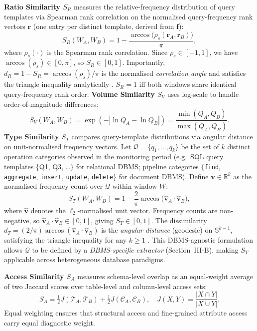 \documentclass[10pt,twocolumn,a4paper]{article}
\newcommand{\SR}{S_{R}}
\newcommand{\SV}{S_{V}}
\newcommand{\ST}{S_{T}}
\newcommand{\SA}{S_{A}}
\begin{document}
\textbf{Ratio Similarity $\SR$} measures the relative-frequency
distribution of query templates via Spearman rank correlation on the
normalised query-frequency rank vectors $\mathbf{r}$ (one entry per
distinct template, derived from $\mathbf{f}$):
\begin{equation}
  \SR(W_A,W_B) = 1 - \frac{\arccos\!\bigl(\rho_s(\mathbf{r}_A,\mathbf{r}_B)\bigr)}{\pi},
\end{equation}
where $\rho_s(\cdot)$ is the Spearman rank correlation.
Since $\rho_s\!\in\![-1,1]$, we have $\arccos(\rho_s)\!\in\![0,\pi]$,
so $\SR\!\in\![0,1]$. Importantly, $d_R\!=\!1\!-\!\SR\!=\!\arccos(\rho_s)/\pi$
is the normalised \emph{correlation angle} and satisfies the triangle
inequality analytically \cite{Deza2009Distances}.
$\SR\!=\!1$ iff both windows share identical query-frequency rank order.
\textbf{Volume Similarity $\SV$} uses log-scale to handle
order-of-magnitude differences:
\begin{equation}
  \SV(W_A,W_B) = \exp(-|\ln Q_A - \ln Q_B|) = \frac{\min(Q_A,Q_B)}{\max(Q_A,Q_B)}.
\end{equation}
\textbf{Type Similarity $\ST$} compares query-template distributions via
angular distance on unit-normalised frequency vectors.
Let $\mathcal{Q}\!=\!\{q_1,\ldots,q_k\}$ be the set of $k$ distinct
operation categories observed in the monitoring period
(e.g.\ SQL query templates $\{$Q1, Q3, \ldots$\}$ for relational DBMS;
pipeline categories $\{$\texttt{find}, \texttt{aggregate},
\texttt{insert}, \texttt{update}, \texttt{delete}$\}$ for document DBMS).
Define $\mathbf{v}\!\in\!\mathbb{R}^k$ as the normalised frequency count
over $\mathcal{Q}$ within window $W$:
\begin{equation}
  \ST(W_A,W_B) = 1 - \frac{2}{\pi}\arccos\!\bigl(\hat{\mathbf{v}}_A\cdot\hat{\mathbf{v}}_B\bigr),
\end{equation}
where $\hat{\mathbf{v}}$ denotes the $\ell_2$-normalised unit vector.
Frequency counts are non-negative, so
$\hat{\mathbf{v}}_A\cdot\hat{\mathbf{v}}_B\!\in\![0,1]$,
giving $\ST\!\in\![0,1]$.
The dissimilarity $d_T\!=\!(2/\pi)\arccos(\hat{\mathbf{v}}_A\cdot\hat{\mathbf{v}}_B)$
is the \emph{angular distance} (geodesic) on $\mathbb{S}^{k-1}$,
satisfying the triangle inequality for any $k\!\geq\!1$
\cite{Deza2009Distances}.
This DBMS-agnostic formulation allows $\mathcal{Q}$ to be defined
by a \emph{DBMS-specific extractor} (Section~III-B), making $\ST$
applicable across heterogeneous database paradigms.

\textbf{Access Similarity $\SA$} measures schema-level overlap as an
equal-weight average of two Jaccard scores over table-level and
column-level access sets:
\begin{equation}
  \SA = \tfrac{1}{2}J(\mathcal{T}_A,\mathcal{T}_B)
       + \tfrac{1}{2}J(\mathcal{C}_A,\mathcal{C}_B),\quad
  J(X,Y)=\frac{|X\cap Y|}{|X\cup Y|}.
\end{equation}
Equal weighting ensures that structural access and fine-grained attribute
access carry equal diagnostic weight.
\end{document}
